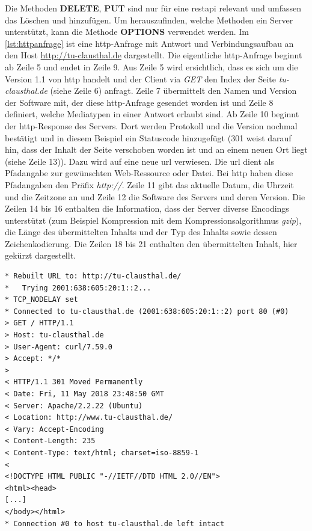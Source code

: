 \documentclass[titlepage]{report}
\begin{document}
Die Methoden \textbf{DELETE}, \textbf{PUT} sind nur für eine
\gls{restapi} relevant und umfassen das Löschen und hinzufügen. Um
herauszufinden, welche Methoden ein Server unterstützt, kann die Methode
\textbf{OPTIONS} verwendet werden.
Im \autoref{lst:httpanfrage} ist eine \gls{http}\hyp{}Anfrage mit Antwort und
Verbindungsaufbau an den Host \url{http://tu-clausthal.de}
dargestellt. Die eigentliche \gls{http}\hyp{}Anfrage beginnt ab Zeile 5
und endet in Zeile 9. Aus Zeile 5 wird ersichtlich, dass es sich um die
Version 1.1 von \gls{http} handelt und der Client via \emph{GET} den
Index der Seite \emph{tu-clausthal.de} (siehe Zeile 6) anfragt. Zeile 7
übermittelt den Namen und Version der Software mit, der diese
\gls{http}\hyp{}Anfrage gesendet worden ist und Zeile 8 definiert,
welche Mediatypen in einer Antwort erlaubt sind\cite{RFC2616}. Ab Zeile
10 beginnt der \gls{http}\hyp{}Response des  Servers. Dort werden Protokoll und die
Version nochmal bestätigt und in diesem Beispiel ein Statuscode
hinzugefügt (301 weist darauf hin, dass der Inhalt der Seite verschoben
worden ist und an einem neuen Ort liegt (siehe Zeile 13)). Dazu wird auf
eine neue \gls{url} verwiesen. Die \gls{url} dient als Pfadangabe zur
gewünschten Web\hyp{}Ressource oder Datei. Bei \gls{http} haben diese
Pfadangaben den Präfix \emph{http://}. Zeile 11 gibt
das aktuelle Datum, die Uhrzeit und die Zeitzone an und Zeile 12 die
Software des Servers und deren Version. Die Zeilen 14 bis 16
enthalten die Information, dass der Server diverse Encodings unterstützt
(zum Beispiel Kompression mit dem Kompressionsalgorithmus \emph{gzip}),
die Länge des übermittelten Inhalts und der Typ des Inhalts sowie dessen
Zeichenkodierung. Die Zeilen 18 bis 21 enthalten den übermittelten
Inhalt, hier gekürzt dargestellt.
\begin{minipage}{\linewidth}
\begin{lstlisting}[caption={Eine HTTP-Anfrage an
http://tu-clausthal.de},label={lst:httpanfrage}]
* Rebuilt URL to: http://tu-clausthal.de/
*   Trying 2001:638:605:20:1::2...
* TCP_NODELAY set
* Connected to tu-clausthal.de (2001:638:605:20:1::2) port 80 (#0)
> GET / HTTP/1.1
> Host: tu-clausthal.de
> User-Agent: curl/7.59.0
> Accept: */*
>
< HTTP/1.1 301 Moved Permanently
< Date: Fri, 11 May 2018 23:48:50 GMT
< Server: Apache/2.2.22 (Ubuntu)
< Location: http://www.tu-clausthal.de/
< Vary: Accept-Encoding
< Content-Length: 235
< Content-Type: text/html; charset=iso-8859-1
<
<!DOCTYPE HTML PUBLIC "-//IETF//DTD HTML 2.0//EN">
<html><head>
[...]
</body></html>
* Connection #0 to host tu-clausthal.de left intact
\end{lstlisting}
\end{minipage}
\end{document}
